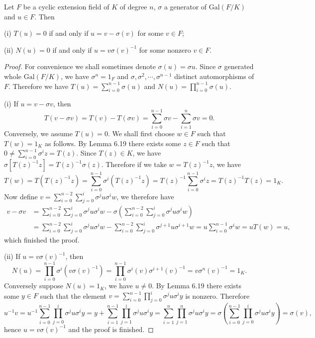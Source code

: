 \begin{theorem}
Let $F$ be a cyclic extension field of $K$ of degree $n$, $\sigma$ a generator of $\mathrm{Gal}(F/K)$ and $u\in F$. Then \par
(i) $T(u)=0$ if and only if $u=v-\sigma(v)$ for some $v\in F$;\par
(ii) $N(u)=0$ if and only if $u=v\sigma(v)^{-1}$ for some nonzero $v\in F$.
\end{theorem}
\begin{proof}
For convenience we shall sometimes denote $\sigma(u)=\sigma u$. Since $\sigma$ generated whole $\mathrm{Gal}(F/K)$, we have $\sigma^n=1_F$ and $\sigma,\sigma^2,\cdots,\sigma^{n-1}$ distinct automorphisms of $F$. Therefore we have $T(u)=\sum_{i=0}^{n-1}\sigma(u)$ and $N(u)=\prod_{i=0}^{n-1}\sigma(u)$.\par
(i) If $u=v-\sigma v$, then 
$$
T\left( v-\sigma v \right) =T\left( v \right) -T\left( \sigma v \right) =\sum_{i=0}^{n-1}{\sigma v}-\sum_{i=1}^n{\sigma v}=0.
$$
Conversely, we assume $T(u)=0$. We shall first choose $w\in F$ such that $T(w)=1_K$ as follows. By Lemma 6.19 there exists some $z\in F$ such that $0\ne\sum_{i=0}^{n-1}\sigma^iz=T(z)$. Since $T(z)\in K$, we have $\sigma[T(z)^{-1}z]=T(z)^{-1}\sigma(z)$. Therefore if we take $w=T(z)^{-1}z$, we have 
$$
T\left( w \right) =T\left( T\left( z \right) ^{-1}z \right) =\sum_{i=0}^{n-1}{\sigma ^i\left( T\left( z \right) ^{-1}z \right)}=T\left( z \right) ^{-1}\sum_{i=0}^{n-1}{\sigma ^iz}=T\left( z \right) ^{-1}T\left( z \right) =1_K.
$$
Now define $v=\sum_{i=0}^{n-2}{\sum_{j=0}^i{\sigma ^ju}\sigma ^iw}$, we therefore have 
$$
\begin{aligned}
v-\sigma v&=\sum_{i=0}^{n-2}{\sum_{j=0}^i{\sigma ^ju}\sigma ^iw}-\sigma \left( \sum_{i=0}^{n-2}{\sum_{j=0}^i{\sigma ^ju}\sigma ^iw} \right) 
\\
&=\sum_{i=0}^{n-2}{\sum_{j=0}^i{\sigma ^ju}\sigma ^iw}-\sum_{i=0}^{n-2}{\sum_{j=0}^i{\sigma ^{j+1}u}\sigma ^{i+1}w}=u\sum_{i=0}^{n-1}{\sigma ^iw}=uT\left( w \right) =u,
\end{aligned}
$$
which finished the proof.\par
(ii) If $u=v\sigma(v)^{-1}$, then 
$$
N\left( u \right) =\prod_{i=0}^{n-1}{\sigma ^i\left( v\sigma \left( v \right) ^{-1} \right)}=\prod_{i=0}^{n-1}{\sigma ^i\left( v \right) \sigma ^{i+1}\left( v \right) ^{-1}}=v\sigma ^n\left( v \right) ^{-1}=1_K.
$$
Conversely suppose $N(u)=1_K$, we have $u\ne 0$. By Lemma 6.19 there exists some $y\in F$ such that the element $v=\sum_{i=0}^{n-1}{\prod_{j=0}^i{\sigma ^ju}\sigma ^iy}$ is nonzero. Therefore 
$$
u^{-1}v=u^{-1}\sum_{i=0}^{n-1}{\prod_{j=0}^i{\sigma ^ju}\sigma ^iy}=y+\sum_{i=1}^{n-1}{\prod_{j=1}^i{\sigma ^ju\sigma ^iy}}=\sum_{i=1}^n{\prod_{j=1}^n{\sigma ^ju\sigma ^iy}}=\sigma \left( \sum_{i=0}^{n-1}{\prod_{j=0}^i{\sigma ^ju}\sigma ^iy} \right) =\sigma \left( v \right) ,
$$
hence $u=v\sigma(v)^{-1}$ and the proof is finished.
\end{proof}
